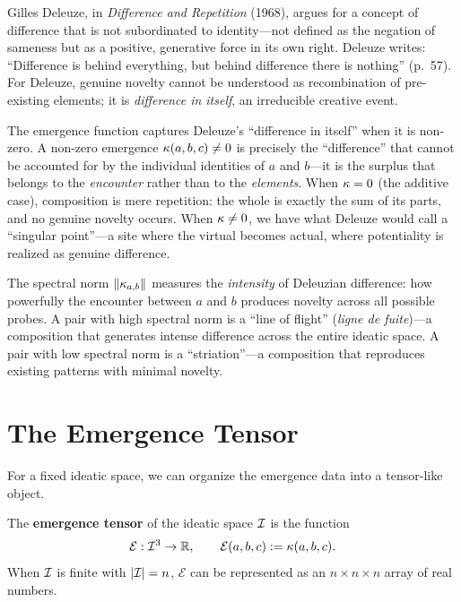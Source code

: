 \begin{interpretation}\label{interp:ch5:deleuze_difference}
Gilles Deleuze, in \emph{Difference and Repetition} (1968), argues for a
concept of difference that is not subordinated to identity---not defined
as the negation of sameness but as a positive, generative force in its
own right. Deleuze writes: ``Difference is behind everything, but behind
difference there is nothing'' (p.~57). For Deleuze, genuine novelty cannot
be understood as recombination of pre-existing elements; it is
\emph{difference in itself}, an irreducible creative event.

The emergence function captures Deleuze's ``difference in itself'' when
it is non-zero. A non-zero emergence $\kappa(a, b, c) \neq 0$ is
precisely the ``difference'' that cannot be accounted for by the
individual identities of $a$ and $b$---it is the surplus that belongs
to the \emph{encounter} rather than to the \emph{elements}. When
$\kappa = 0$ (the additive case), composition is mere repetition:
the whole is exactly the sum of its parts, and no genuine novelty
occurs. When $\kappa \neq 0$, we have what Deleuze would call a
``singular point''---a site where the virtual becomes actual, where
potentiality is realized as genuine difference.

The spectral norm $\|\kappa_{a,b}\|$ measures the \emph{intensity} of
Deleuzian difference: how powerfully the encounter between $a$ and $b$
produces novelty across all possible probes. A pair with high spectral
norm is a ``line of flight'' (\emph{ligne de fuite})---a composition that
generates intense difference across the entire ideatic space. A pair with
low spectral norm is a ``striation''---a composition that reproduces
existing patterns with minimal novelty.
\end{interpretation}

\section{The Emergence Tensor}

For a fixed ideatic space, we can organize the emergence data into a
tensor-like object.

\begin{definition}
The \textbf{emergence tensor} of the ideatic space $\mathcal{I}$ is the function
\[
    \mathcal{E} : \mathcal{I}^3 \to \mathbb{R}, \qquad
    \mathcal{E}(a, b, c) := \kappa(a, b, c).
\]
When $\mathcal{I}$ is finite with $|\mathcal{I}| = n$, $\mathcal{E}$ can be represented
as an $n \times n \times n$ array of real numbers.
\end{definition}

